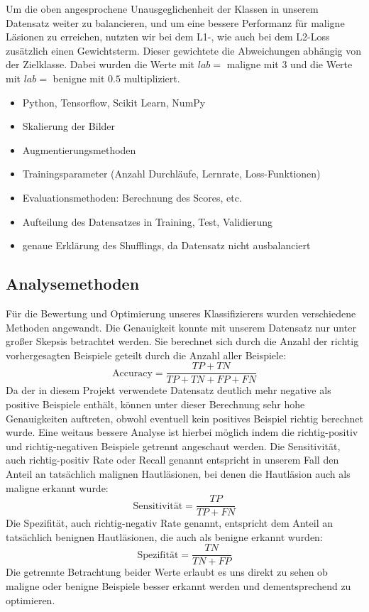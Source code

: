 Um die oben angesprochene Unausgeglichenheit der Klassen in unserem Datensatz weiter zu balancieren, und um eine bessere Performanz für maligne Läsionen zu erreichen, nutzten wir bei dem L1-, wie auch bei dem L2-Loss zusätzlich einen Gewichtsterm. Dieser gewichtete die Abweichungen abhängig von der Zielklasse. Dabei wurden die Werte mit $lab=$ maligne mit $3$ und die Werte mit $lab=$ benigne mit $0.5$ multipliziert. 
	  

\color{red}
\begin{itemize}
	\item[\checkmark] Python, Tensorflow, Scikit Learn, NumPy
	\item[\checkmark] Skalierung der Bilder
	\item[\checkmark] Augmentierungsmethoden
	\item[\checkmark] Trainingsparameter (Anzahl Durchläufe, Lernrate, Loss-Funktionen)
	\item[\checkmark] Evaluationsmethoden: Berechnung des Scores, etc.
	\item[\checkmark] Aufteilung des Datensatzes in Training, Test, Validierung
	\item[\checkmark] genaue Erklärung des Shufflings, da Datensatz nicht ausbalanciert
\end{itemize}
\color{black}

\subsection{Analysemethoden}

Für die Bewertung und Optimierung unseres Klassifizierers wurden verschiedene Methoden angewandt. Die Genauigkeit konnte mit unserem Datensatz nur unter großer Skepsis betrachtet werden. Sie berechnet sich durch die Anzahl der richtig vorhergesagten Beispiele geteilt durch die Anzahl aller Beispiele:
	\[\text{Accuracy} = \frac{TP+TN}{TP+TN+FP+FN}\]
Da der in diesem Projekt verwendete Datensatz deutlich mehr negative als positive Beispiele enthält, können unter dieser Berechnung sehr hohe Genauigkeiten auftreten, obwohl eventuell kein positives Beispiel richtig berechnet wurde. Eine weitaus bessere Analyse ist hierbei möglich indem die richtig-positiv und richtig-negativen Beispiele getrennt angeschaut werden. Die Sensitivität, auch richtig-positiv Rate oder Recall genannt entspricht in unserem Fall den Anteil an tatsächlich malignen Hautläsionen, bei denen die Hautläsion auch als maligne erkannt wurde: 
\[\text{Sensitivität} = \frac{TP}{TP+FN}\]
Die Spezifität, auch richtig-negativ Rate genannt, entspricht dem Anteil an tatsächlich benignen Hautläsionen, die auch als benigne erkannt wurden:
\[\text{Spezifität} = \frac{TN}{TN+FP}\]
Die getrennte Betrachtung beider Werte erlaubt es uns direkt zu sehen ob maligne oder benigne Beispiele besser erkannt werden und dementsprechend zu optimieren.

